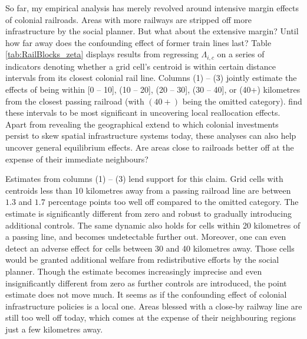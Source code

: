 \documentclass[11pt, oneside]{article}   	%
\begin{document}

So far, my empirical analysis has merely revolved around intensive margin effects of colonial railroads. Areas with more railways are stripped off more infrastructure by the social planner. But what about the extensive margin? Until how far away does the confounding effect of former train lines last? Table \eqref{tab:RailBlocks_zeta} displays results from regressing $\Lambda_{i,c}$ on a series of indicators denoting whether a grid cell's centroid is within certain distance intervals from its closest colonial rail line. Columns (1) -- (3) jointly estimate the effects of being within [0 -- 10], (10 -- 20], (20 -- 30], (30 -- 40], or (40+) kilometres from the closest passing railroad (with $(40+)$ being the omitted category). \cite{jedwab_permanent_2016} find these intervals to be most significant in uncovering local reallocation effects. Apart from revealing the geographical extend to which colonial investments persist to skew spatial infrastructure systems today, these analyses can also help uncover general equilibrium effects. Are areas close to railroads better off at the expense of their immediate neighbours?

Estimates from columns (1) -- (3) lend support for this claim. Grid cells with centroids less than 10 kilometres away from a passing railroad line are between $1.3$ and $1.7$ percentage points too well off compared to the omitted category. The estimate is significantly different from zero and robust to gradually introducing additional controls. The same dynamic also holds for cells within 20 kilometres of a passing line, and becomes undetectable further out. Moreover, one can even detect an adverse effect for cells between 30 and 40 kilometres away. Those cells would be granted additional welfare from redistributive efforts by the social planner. Though the estimate becomes increasingly imprecise and even insignificantly different from zero as further controls are introduced, the point estimate does not move much. It seems as if the confounding effect of colonial infrastructure policies is a local one. Areas blessed with a close-by railway line are still too well off today, which comes at the expense of their neighbouring regions just a few kilometres away.
\end{document}
